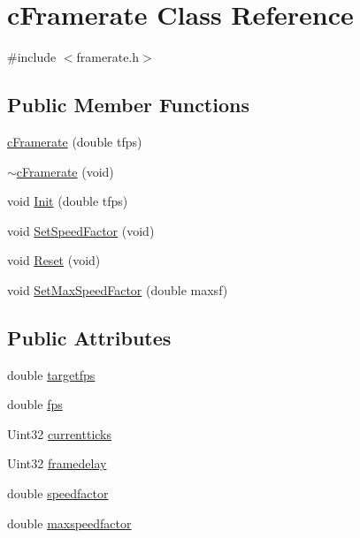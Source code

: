 \hypertarget{classc_framerate}{\section{c\-Framerate Class Reference}
\label{classc_framerate}
}


{\ttfamily \#include $<$framerate.\-h$>$}

\subsection*{Public Member Functions}
\begin{DoxyCompactItemize}
\item 
\hyperlink{classc_framerate_a7a6d7e410f142274342e1f12d745374f}{c\-Framerate} (double tfps)
\item 
\hyperlink{classc_framerate_a3047e81257b614ed764dd927765bbecc}{$\sim$c\-Framerate} (void)
\item 
void \hyperlink{classc_framerate_a20400baeef461694fed8d4d18da336d9}{Init} (double tfps)
\item 
void \hyperlink{classc_framerate_a526a4eb7f2f5f5894aebc47654be6573}{Set\-Speed\-Factor} (void)
\item 
void \hyperlink{classc_framerate_a989508dcaae1a97113f844df00219dd4}{Reset} (void)
\item 
void \hyperlink{classc_framerate_a97e001004c25e02c03f2f74d0dc11ad0}{Set\-Max\-Speed\-Factor} (double maxsf)
\end{DoxyCompactItemize}
\subsection*{Public Attributes}
\begin{DoxyCompactItemize}
\item 
double \hyperlink{classc_framerate_af5658ae10ecbaecab7b26251bfc5603b}{targetfps}
\item 
double \hyperlink{classc_framerate_aeb71e09b4f0594be70662e3d49e6f642}{fps}
\item 
Uint32 \hyperlink{classc_framerate_a39fc2911484b7c47e7e1525fd5e560ba}{currentticks}
\item 
Uint32 \hyperlink{classc_framerate_ab1633b38d250740c08899cde6c85de20}{framedelay}
\item 
double \hyperlink{classc_framerate_a5852e9eaeadefcd0da9d0e5c9ec63980}{speedfactor}
\item 
double \hyperlink{classc_framerate_ad1bca95d162390adcab7352edf2b839c}{maxspeedfactor}
\end{DoxyCompactItemize}


